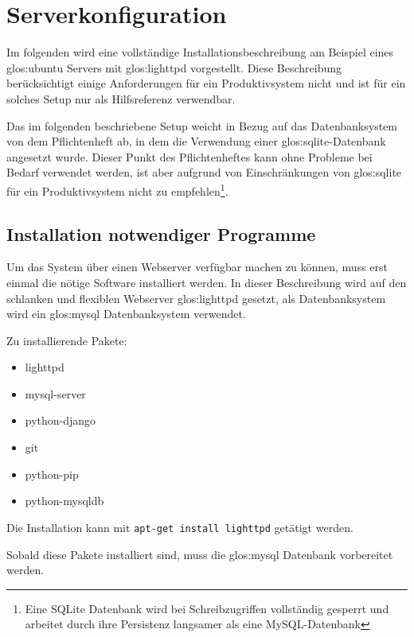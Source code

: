 \chapter{Serverkonfiguration}
Im folgenden wird eine vollständige Installationsbeschreibung am Beispiel eines
\Gls{glos:ubuntu} Servers mit \Gls{glos:lighttpd} vorgestellt. Diese
Beschreibung berücksichtigt einige Anforderungen für ein Produktivsystem nicht
und ist für ein solches Setup nur als Hilfsreferenz verwendbar. 

Das im folgenden beschriebene Setup weicht in Bezug auf das Datenbanksystem von
dem Pflichtenheft ab, in dem die Verwendung einer \Gls{glos:sqlite}-Datenbank
angesetzt wurde. Dieser Punkt des Pflichtenheftes kann ohne Probleme bei Bedarf
verwendet werden, ist aber aufgrund von Einschränkungen von \Gls{glos:sqlite}
für ein Produktivsystem nicht zu empfehlen\footnote{Eine SQLite Datenbank wird
bei Schreibzugriffen vollständig gesperrt und arbeitet durch ihre Persistenz
langsamer als eine MySQL-Datenbank}.

\section{Installation notwendiger Programme}
Um das System über einen Webserver verfügbar machen zu können, muss erst einmal
die nötige Software installiert werden. In dieser Beschreibung wird auf den
schlanken und flexiblen Webserver \Gls{glos:lighttpd} gesetzt, als
Datenbanksystem wird ein \Gls{glos:mysql} Datenbanksystem verwendet.

Zu installierende Pakete:
\begin{itemize}
  \item lighttpd
  \item mysql-server
  \item python-django
  \item git
  \item python-pip
  \item python-mysqldb
\end{itemize}
Die Installation kann mit \zB \lstinline{apt-get install lighttpd} getätigt
werden.

Sobald diese Pakete installiert sind, muss die \Gls{glos:mysql} Datenbank
vorbereitet werden.

